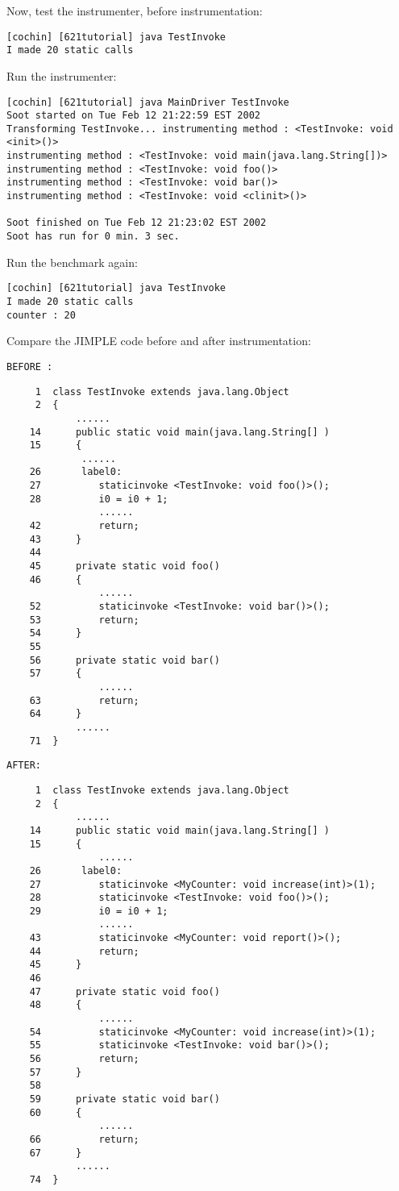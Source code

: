 \documentclass[12pt]{article}
\begin{document}
\noindent
Now, test the instrumenter, before instrumentation:
\begin{verbatim}
[cochin] [621tutorial] java TestInvoke
I made 20 static calls
\end{verbatim}

\noindent
Run the instrumenter:
\begin{verbatim}
[cochin] [621tutorial] java MainDriver TestInvoke
Soot started on Tue Feb 12 21:22:59 EST 2002
Transforming TestInvoke... instrumenting method : <TestInvoke: void <init>()>
instrumenting method : <TestInvoke: void main(java.lang.String[])>
instrumenting method : <TestInvoke: void foo()>
instrumenting method : <TestInvoke: void bar()>
instrumenting method : <TestInvoke: void <clinit>()>
 
Soot finished on Tue Feb 12 21:23:02 EST 2002
Soot has run for 0 min. 3 sec.
\end{verbatim}

\noindent
Run the benchmark again:
\begin{verbatim}
[cochin] [621tutorial] java TestInvoke
I made 20 static calls
counter : 20
\end{verbatim}

\noindent
Compare the JIMPLE code before and after instrumentation:

\noindent
{\tt BEFORE :}
\begin{verbatim}
     1  class TestInvoke extends java.lang.Object
     2  {
            ......
    14      public static void main(java.lang.String[] )
    15      {
             ......
    26       label0:
    27          staticinvoke <TestInvoke: void foo()>();
    28          i0 = i0 + 1;
                ......
    42          return;
    43      }
    44
    45      private static void foo()
    46      {
                ......
    52          staticinvoke <TestInvoke: void bar()>();
    53          return;
    54      }
    55
    56      private static void bar()
    57      {
                ......
    63          return;
    64      }
            ......
    71  }
\end{verbatim}

\noindent
{\tt AFTER:}
\begin{verbatim}
     1  class TestInvoke extends java.lang.Object
     2  {
            ......
    14      public static void main(java.lang.String[] )
    15      {
                ......
    26       label0:
    27          staticinvoke <MyCounter: void increase(int)>(1);
    28          staticinvoke <TestInvoke: void foo()>();
    29          i0 = i0 + 1;
                ......
    43          staticinvoke <MyCounter: void report()>();
    44          return;
    45      }
    46
    47      private static void foo()
    48      {
                ......
    54          staticinvoke <MyCounter: void increase(int)>(1);
    55          staticinvoke <TestInvoke: void bar()>();
    56          return;
    57      }
    58
    59      private static void bar()
    60      {
                ......
    66          return;
    67      }
            ......
    74  }
\end{verbatim}
\end{document}
